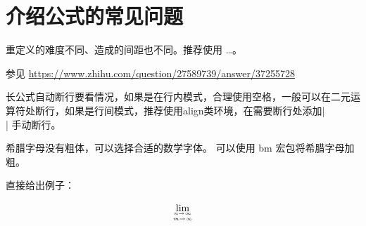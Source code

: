 %
%
%
%


\let\fancybreak\relax

\section{介绍公式的常见问题}



重定义的难度不同、造成的间距也不同。推荐使用 \cs{[} \ldots \cs{]}。 

参见
\url{https://www.zhihu.com/question/27589739/answer/37255728}



长公式自动断行要看情况，如果是在行内模式，合理使用空格，一般可以在二元运算符处断行，如果是行间模式，推荐使用align类环境，在需要断行处添加|\\|%
手动断行。



希腊字母没有粗体，可以选择合适的数学字体。 可以使用 bm
宏包将希腊字母加粗。



直接给出例子：

\begin{example}
\[ \lim_{n\to\infty\atop m\to\infty} \]
\end{example}
%

